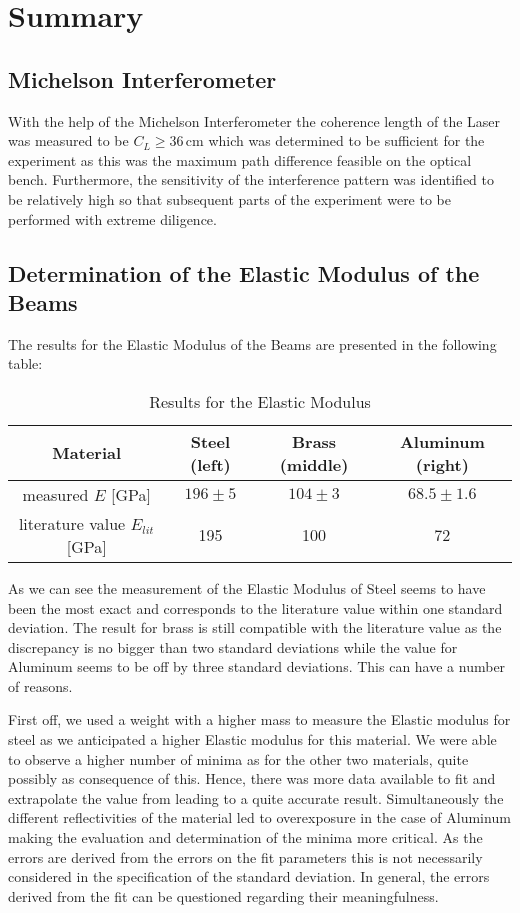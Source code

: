 \section{Summary}

\subsection{Michelson Interferometer}

With the help of the Michelson Interferometer the coherence length of the Laser was measured to be $C_L \geq 36\,\mathrm{cm}$ which was determined to be sufficient for the experiment as this was the maximum path difference feasible on the optical bench. Furthermore, the sensitivity of the interference pattern was identified to be relatively high so that subsequent parts of the experiment were to be performed with extreme diligence.

\subsection{Determination of the Elastic Modulus of the Beams}

The results for the Elastic Modulus of the Beams are presented in the following table:

\begin{table}[h!]
	\centering
	\begin{tabular}{c|c|c|c}
		Material							& Steel (left)	& Brass (middle)	& Aluminum (right)\\ \hline\hline
		measured $E$ [GPa]			& $196\pm5$	& 	$104\pm3$		& $68.5\pm1.6$			\\ \hline
	literature value \cite{staats} $E_{lit}$ [GPa]	& 195			& 100				& 72
	\end{tabular}
	\caption{Results for the Elastic Modulus}
\end{table}

As we can see the measurement of the Elastic Modulus of Steel seems to have been the most exact and corresponds to the literature value within one standard deviation.  The result for brass is still compatible with the literature value as the discrepancy is no bigger than two standard deviations while the value for Aluminum seems to be off by three standard deviations. This can have a number of reasons.

First off, we used a weight with a higher mass to measure the Elastic modulus for steel as we anticipated a higher Elastic modulus for this material. We were able to observe a higher number of minima as for the other two materials, quite possibly as consequence of this. Hence, there was more data available to fit and extrapolate the value from leading to a quite accurate result.
Simultaneously the different reflectivities of the material led to overexposure in the case of Aluminum making the evaluation and determination of the minima more critical. As the errors are derived from the errors on the fit parameters this is not necessarily considered in the specification of the standard deviation. In general, the errors derived from the fit can be questioned regarding their meaningfulness.


